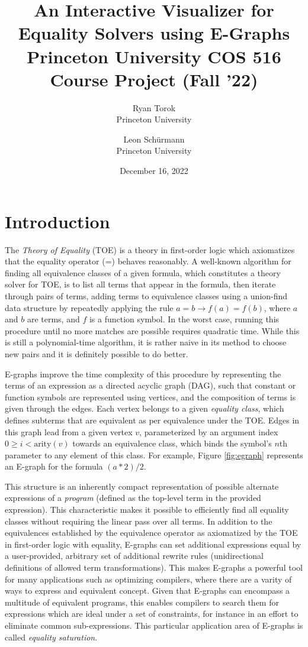 \documentclass[letterpaper,twocolumn,11pt]{article}
\date{December 16, 2022}
\title{%
  {\Large \bf An Interactive Visualizer for Equality Solvers using E-Graphs}\\%
  {\large Princeton University COS 516 Course Project (Fall '22)}%
}
\author{ {\rm Ryan Torok}\\ Princeton University \and {\rm Leon Sch\"urmann}\\ Princeton University
} %
\begin{document}
\maketitle

\section{Introduction}

The \textit{Theory of Equality} (TOE) is a theory in first-order logic which
axiomatizes that the equality operator (=) behaves reasonably\cite{bm}. A
well-known algorithm for finding all equivalence classes of a given formula,
which constitutes a theory solver for TOE, is to list all terms that appear in
the formula, then iterate through pairs of terms, adding terms to equivalence
classes using a union-find data structure by repeatedly applying the rule $a = b
\rightarrow f(a) = f(b)$, where $a$ and $b$ are terms, and $f$ is a function
symbol. In the worst case, running this procedure until no more matches are
possible requires quadratic time. While this is still a polynomial-time
algorithm, it is rather naive in its method to choose new pairs and it is
definitely possible to do better.

E-graphs \cite{egraphs} improve the time complexity of this procedure by
representing the terms of an expression as a directed acyclic graph (DAG), such
that constant or function symbols are represented using vertices, and the
composition of terms is given through the edges. Each vertex belongs to a given
\textit{equality class}, which defines subterms that are equivalent as per
equivalence under the TOE. Edges in this graph lead from a given vertex $v$,
parameterized by an argument index $0 \geq i < \text{arity}(v)$ towards an
equivalence class, which binds the symbol's $n$th parameter to any element of
this class. For example, Figure \ref{fig:egraph} represents an E-graph for the
formula $(a * 2) / 2$.

This structure is an inherently compact representation of possible alternate
expressions of a \textit{program} (defined as the top-level term in the provided
expression). This characteristic makes it possible to efficiently find all
equality classes without requiring the linear pass over all terms. In addition
to the equivalences established by the equivalence operator as axiomatized by
the TOE in first-order logic with equality, E-graphs can set additional
expressions equal by a user-provided, arbitrary set of additional rewrite rules
(unidirectional definitions of allowed term transformations). This makes
E-graphs a powerful tool for many applications such as optimizing compilers,
where there are a varity of ways to express and equivalent concept. Given that
E-graphs can encompass a multitude of equivalent programs, this enables
compilers to search them for expressions which are ideal under a set of
constraints, for instance in an effort to eliminate common sub-expressions. This
particular application area of E-graphs is called \textit{equality saturation}.
\end{document}
